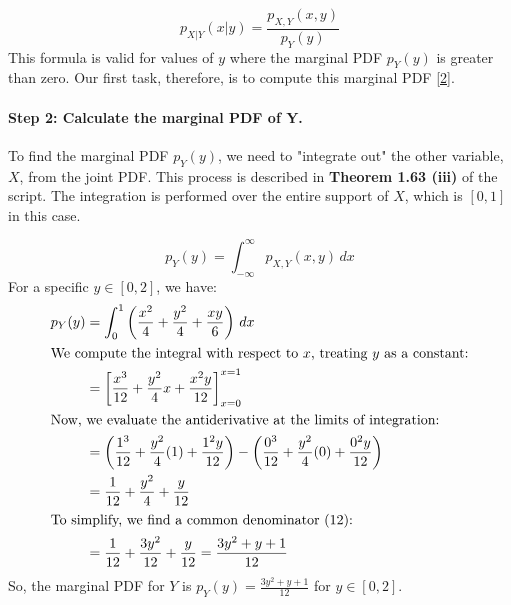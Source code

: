 \documentclass[11pt,a4paper]{article}
\begin{document}
\begin{equation} \label{eq:cond_pdf}
p_{X|Y}(x|y) = \frac{p_{X,Y}(x,y)}{p_Y(y)}
\end{equation}
This formula is valid for values of $y$ where the marginal PDF $p_Y(y)$ is greater than zero. Our first task, therefore, is to compute this marginal PDF \hyperlink{note2}{[2]}.

\paragraph{Step 2: Calculate the marginal PDF of Y.}
To find the marginal PDF $p_Y(y)$, we need to "integrate out" the other variable, $X$, from the joint PDF. This process is described in \textbf{Theorem 1.63 (iii)} of the script. The integration is performed over the entire support of $X$, which is $[0,1]$ in this case.

\[
p_Y(y) = \int_{-\infty}^{\infty} p_{X,Y}(x,y) \,dx
\]
For a specific $y \in [0,2]$, we have:
\begin{align*}
p_Y(y) &= \int_{0}^{1} \left( \frac{x^2}{4} + \frac{y^2}{4} + \frac{xy}{6} \right) \,dx \\
\intertext{We compute the integral with respect to $x$, treating $y$ as a constant:}
&= \left[ \frac{x^3}{12} + \frac{y^2}{4}x + \frac{x^2y}{12} \right]_{x=0}^{x=1} \\
\intertext{Now, we evaluate the antiderivative at the limits of integration:}
&= \left( \frac{1^3}{12} + \frac{y^2}{4}(1) + \frac{1^2y}{12} \right) - \left( \frac{0^3}{12} + \frac{y^2}{4}(0) + \frac{0^2y}{12} \right) \\
&= \frac{1}{12} + \frac{y^2}{4} + \frac{y}{12} \\
\intertext{To simplify, we find a common denominator (12):}
&= \frac{1}{12} + \frac{3y^2}{12} + \frac{y}{12} = \frac{3y^2 + y + 1}{12}
\end{align*}
So, the marginal PDF for $Y$ is $p_Y(y) = \frac{3y^2 + y + 1}{12}$ for $y \in [0,2]$.
\end{document}
